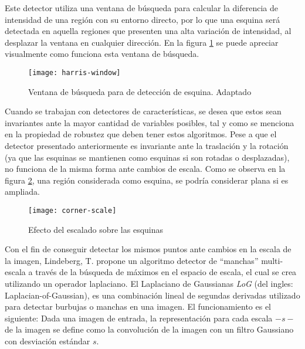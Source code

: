 Este detector utiliza una ventana de búsqueda para calcular la diferencia de intensidad de una región con su entorno directo, por lo que una esquina  será detectada en aquella regiones que presenten una alta variación de intensidad, al desplazar la ventana en cualquier dirección. En la figura \ref{imagen:harris-window} se puede apreciar visualmente como funciona esta ventana de búsqueda.

\begin{figure}[H]
	\centering
	\texttt{[image: harris-window]}
	\caption[Ventana de búsqueda para de detección de esquinas]{Ventana de búsqueda para de detección de esquina. Adaptado\protect\footnotemark}
	\label{imagen:harris-window}
\end{figure}

Cuando se trabajan con detectores de características, se desea que estos sean invariantes ante la mayor cantidad de variables posibles, tal y como se menciona en la propiedad de robustez que deben tener estos algoritmos. Pese a que el detector presentado anteriormente es invariante ante la traslación y la rotación (ya que las esquinas se mantienen como esquinas si son rotadas o desplazadas), no funciona de la misma forma ante cambios de escala. Como se observa en la figura \ref{imagen:corner-scale}, una región considerada como esquina, se podría considerar plana si es ampliada.

\begin{figure}[H]
	\centering
	\texttt{[image: corner-scale]}
	\caption[Efecto del escalado sobre las esquinas]{Efecto del escalado sobre las esquinas	\protect\footnotemark}
	\label{imagen:corner-scale}
\end{figure}

Con el fin de conseguir detectar los mismos puntos ante cambios en la escala de la imagen, Lindeberg, T. \cite{log} propone un algoritmo detector de ``manchas'' multi-escala a través de la búsqueda de máximos en el espacio de escala, el cual se crea utilizando un operador laplaciano. El Laplaciano de Gaussianas \textit{LoG} (del ingles: Laplacian-of-Gaussian), es una combinación lineal de segundas derivadas utilizado para detectar burbujas o manchas en una imagen. El funcionamiento es el siguiente: Dada una imagen de entrada, la representación para cada escala $-s-$ de la imagen se define como la convolución de la imagen con un filtro Gaussiano con desviación estándar $s$.

